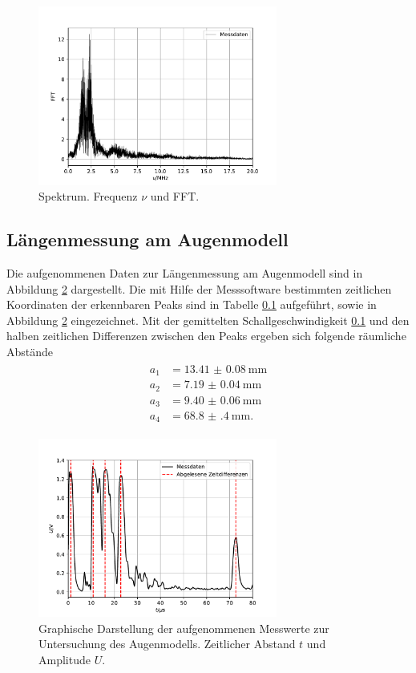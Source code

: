 \begin{figure}[H]
  \centering
  \includegraphics[width = 0.7\textwidth]{../Messdaten/plots/spectrum.pdf}
  \caption{Spektrum. Frequenz $\nu$ und FFT.}
  \label{fig: spektrum}
\end{figure}

\subsection{Längenmessung am Augenmodell}
Die aufgenommenen Daten zur Längenmessung am Augenmodell sind in Abbildung \ref{fig: auge} dargestellt. Die mit Hilfe
der Messsoftware bestimmten zeitlichen Koordinaten der erkennbaren Peaks sind in Tabelle \ref{} aufgeführt, sowie in Abbildung
\ref{fig: auge} eingezeichnet. Mit der gemittelten Schallgeschwindigkeit \ref{} und den halben zeitlichen Differenzen zwischen den
Peaks ergeben sich folgende räumliche Abstände
\begin{align}
  \begin{aligned}
  a_1 &= \SI{+13.41(8)}{\milli\meter}\\
  a_2 &= \SI{+7.19(4)}{\milli\meter}\\
  a_3 &= \SI{+9.40(6)}{\milli\meter}\\
  a_4 &= \SI{+68.8(4)}{\milli\meter}.
\end{aligned}
\end{align}


\begin{figure}[H]
  \centering
  \includegraphics[width = 0.7\textwidth]{../Messdaten/plots/auge.pdf}
  \caption{Graphische Darstellung der aufgenommenen Messwerte zur Untersuchung des Augenmodells. Zeitlicher Abstand $t$ und Amplitude $U$.}
  \label{fig: auge}
\end{figure}
